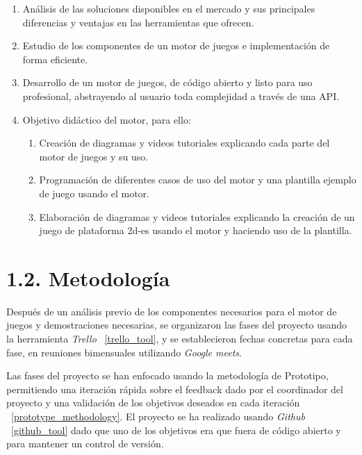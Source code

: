 \begin{enumerate}[label=\textbf{O\arabic*.}]
    \item Análisis de las soluciones disponibles en el mercado y sus principales diferencias y ventajas en las herramientas que ofrecen.
    \item Estudio de los componentes de un motor de juegos e implementación de forma eficiente.
    \item Desarrollo de un motor de juegos, de código abierto y listo para uso profesional, abstrayendo al usuario toda complejidad a través de una API.
    \item Objetivo didáctico del motor, para ello:
    \begin{enumerate}[label=\textbf{O4.\arabic*.}]
        \item Creación de diagramas y videos tutoriales explicando cada parte del motor de juegos y su uso.
        \item Programación de diferentes casos de uso del motor y una plantilla ejemplo de juego usando el motor.
        \item Elaboración de diagramas y videos tutoriales explicando la creación de un juego de plataforma
         \gls{2d-es} usando el motor y haciendo uso de la plantilla.
    \end{enumerate}
\end{enumerate}

\newpage

\section*{1.2. Metodología}\label{sec:methodology}

Después de un análisis previo de los componentes necesarios para el motor de juegos y demostraciones necesarias,
se organizaron las fases del proyecto usando la herramienta \textit{Trello} \figurename~\ref{trello_tool}, y se establecieron fechas concretas para
cada fase, en reuniones bimensuales utilizando \textit{Google meets}.

Las fases del proyecto se han enfocado usando la metodología de Prototipo, permitiendo una iteración rápida
sobre el feedback dado por el coordinador del proyecto y una validación de los objetivos deseados en cada iteración \figurename~\ref{prototype_methodology}.
El proyecto se ha realizado usando \textit{Github} \figurename~\ref{github_tool} dado que uno de los objetivos era que fuera de código abierto y para
mantener un control de versión.

